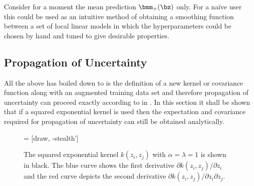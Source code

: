 Consider for a moment the mean prediction $\bmm_{+}(\bz)$ only. For a na\"{i}ve user this could be used as an intuitive method of obtaining a smoothing function between a set of local linear models in which the hyperparameters could be chosen by hand and tuned to give desirable properties.



\subsection{Propagation of Uncertainty}

All the above has boiled down to is the definition of a new kernel or covariance function along with an augmented training data set and therefore propagation of uncertainty can proceed exactly according to  in . In this section it shall be shown that if a squared exponential kernel is used then the expectation and covariance required for propagation of uncertainty can still be obtained analytically.



\begin{figure}[t]
\centering
{} = [draw, -stealth']
\footnotesize
{}
%
\caption{The squared exponential kernel $k(z_i,z_j)$ with $\alpha = \lambda = 1$ is shown in black. The blue curve shows the first derivative $\partial k(z_i,z_j)/\partial z_i$ and the red curve depicts the second derivative $\partial k(z_i,z_j)/\partial z_i\partial z_j$.}
\label{fig:dSEkernel}
\end{figure}


